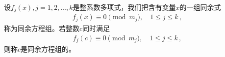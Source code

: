 
\begin{definition}
    设$f_j(x), j=1,2,\ldots,k$是整系数多项式，我们把含有变量$x$的一组同余式
    \begin{align}\label{eq:7.ex02.congruencegroup}
        f_j(x)\equiv0\pmod{m_j},\quad 1\le j\le k\, ,
    \end{align}
    称为{\sffamily 同余方程组}。若整数$c$同时满足
    \begin{align}
        f_j(c)\equiv0\pmod{m_j},\quad 1\le j\le k\, ,
    \end{align}
    则称$c$是同余方程组的。
\end{definition}

